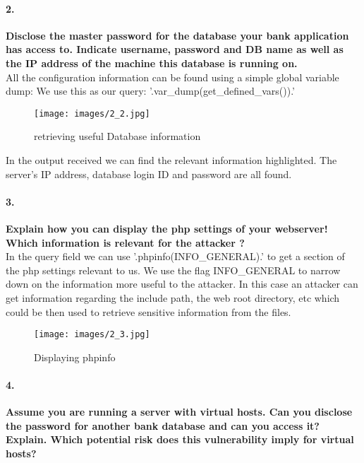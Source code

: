 \documentclass[12pt]{report}
\begin{document}
	
	\paragraph*{2.}{\bf Disclose the master password for the database your bank application has access to. Indicate username, password and DB name as well as the IP address of the machine this database is running on.}\\
	
	All the configuration information can be found using a simple global variable dump:
	We use this as our query: '.var\_dump(get\_defined\_vars()).'
	
	\begin{figure}[H]
		\texttt{[image: images/2\_2.jpg]}
		\caption{retrieving useful Database information }
	\end{figure}
	
	In the output received we can find the relevant information highlighted. The server's IP address, database login ID and password are all found.
	
	\paragraph*{3.}{\bf Explain how you can display the php settings of your webserver! Which information is relevant for the attacker ?}\\
	
	In the query field we can use '.phpinfo(INFO\_GENERAL).' to get a section of the php settings relevant to us. We use the flag INFO\_GENERAL to narrow down on the information more useful to the attacker. In this case an attacker can get information regarding the include path, the web root directory, etc which could be then used to retrieve sensitive information from the files.
	
	
	\begin{figure}[H]
		\texttt{[image: images/2\_3.jpg]}
		\caption{Displaying phpinfo}
	\end{figure}
	
	\paragraph*{4.}{\bf Assume you are running a server with virtual hosts. Can you disclose the password for another bank database	and can you access it? Explain. Which potential risk does this vulnerability imply for virtual hosts?}\\
	
\end{document}
